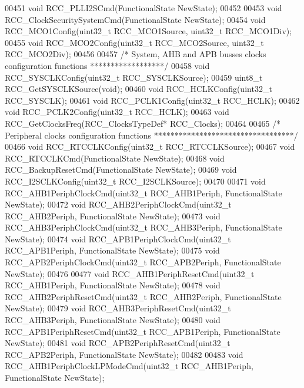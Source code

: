 \begin{DoxyCode}
00451 \textcolor{keywordtype}{void} RCC_PLLI2SCmd(FunctionalState NewState);
00452 
00453 \textcolor{keywordtype}{void} RCC_ClockSecuritySystemCmd(FunctionalState NewState);
00454 \textcolor{keywordtype}{void} RCC_MCO1Config(uint32\_t RCC\_MCO1Source, uint32\_t RCC\_MCO1Div);
00455 \textcolor{keywordtype}{void} RCC_MCO2Config(uint32\_t RCC\_MCO2Source, uint32\_t RCC\_MCO2Div);
00456 
00457 \textcolor{comment}{/* System, AHB and APB busses clocks configuration functions ******************/}
00458 \textcolor{keywordtype}{void} RCC_SYSCLKConfig(uint32\_t RCC\_SYSCLKSource);
00459 uint8\_t RCC_GetSYSCLKSource(\textcolor{keywordtype}{void});
00460 \textcolor{keywordtype}{void} RCC_HCLKConfig(uint32\_t RCC\_SYSCLK);
00461 \textcolor{keywordtype}{void} RCC_PCLK1Config(uint32\_t RCC\_HCLK);
00462 \textcolor{keywordtype}{void} RCC_PCLK2Config(uint32\_t RCC\_HCLK);
00463 \textcolor{keywordtype}{void} RCC_GetClocksFreq(RCC\_ClocksTypeDef* RCC\_Clocks);
00464 
00465 \textcolor{comment}{/* Peripheral clocks configuration functions **********************************/}
00466 \textcolor{keywordtype}{void} RCC_RTCCLKConfig(uint32\_t RCC\_RTCCLKSource);
00467 \textcolor{keywordtype}{void} RCC_RTCCLKCmd(FunctionalState NewState);
00468 \textcolor{keywordtype}{void} RCC_BackupResetCmd(FunctionalState NewState);
00469 \textcolor{keywordtype}{void} RCC_I2SCLKConfig(uint32\_t RCC\_I2SCLKSource);
00470 
00471 \textcolor{keywordtype}{void} RCC_AHB1PeriphClockCmd(uint32\_t RCC\_AHB1Periph, FunctionalState NewState);
00472 \textcolor{keywordtype}{void} RCC_AHB2PeriphClockCmd(uint32\_t RCC\_AHB2Periph, FunctionalState NewState);
00473 \textcolor{keywordtype}{void} RCC_AHB3PeriphClockCmd(uint32\_t RCC\_AHB3Periph, FunctionalState NewState);
00474 \textcolor{keywordtype}{void} RCC_APB1PeriphClockCmd(uint32\_t RCC\_APB1Periph, FunctionalState NewState);
00475 \textcolor{keywordtype}{void} RCC_APB2PeriphClockCmd(uint32\_t RCC\_APB2Periph, FunctionalState NewState);
00476 
00477 \textcolor{keywordtype}{void} RCC_AHB1PeriphResetCmd(uint32\_t RCC\_AHB1Periph, FunctionalState NewState);
00478 \textcolor{keywordtype}{void} RCC_AHB2PeriphResetCmd(uint32\_t RCC\_AHB2Periph, FunctionalState NewState);
00479 \textcolor{keywordtype}{void} RCC_AHB3PeriphResetCmd(uint32\_t RCC\_AHB3Periph, FunctionalState NewState);
00480 \textcolor{keywordtype}{void} RCC_APB1PeriphResetCmd(uint32\_t RCC\_APB1Periph, FunctionalState NewState);
00481 \textcolor{keywordtype}{void} RCC_APB2PeriphResetCmd(uint32\_t RCC\_APB2Periph, FunctionalState NewState);
00482 
00483 \textcolor{keywordtype}{void} RCC_AHB1PeriphClockLPModeCmd(uint32\_t RCC\_AHB1Periph, FunctionalState NewState);

\end{DoxyCode}
